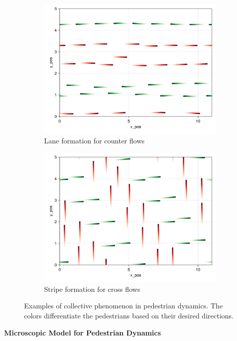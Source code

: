 \begin{figure}[H]
    \centering
    \begin{subfigure}{.49\textwidth}
        \centering
        \includegraphics[width=\linewidth]{figures/counter_40_2flow_10000.png}
        \caption{Lane formation for counter flows}
        \label{plot:example_cross}
    \end{subfigure}
    \begin{subfigure}{.49\textwidth}
        \centering
        \includegraphics[width=\linewidth]{figures/cross_40_2flow_10000.png}
        \caption{Stripe formation for cross flows}
        \label{plot:example_counter}
    \end{subfigure}
    \caption{Examples of collective phenomenon in pedestrian dynamics. The colors differentiate the pedestrians based on their desired directions.}
    \label{plot:examples}
\end{figure}
\textbf{Microscopic Model for Pedestrian Dynamics}

